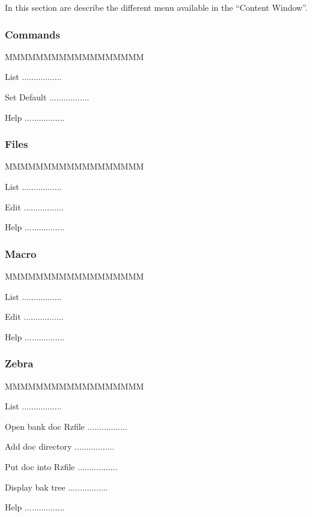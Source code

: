 In this section are describe the different menu available in the 
``Content Window''.

\subsubsection{Commands}

\begin{DLsf}{MMMMMMMMMMMMMMMMMM}
\item[List]         .................
\item[Set Default]  .................
\item[Help]  .................
\end{DLsf}

\newpage
\subsubsection{Files}

\begin{DLsf}{MMMMMMMMMMMMMMMMMM}
\item[List]         .................
\item[Edit]  .................
\item[Help]  .................
\end{DLsf}

\newpage
{}
\subsubsection{Macro}
\begin{DLsf}{MMMMMMMMMMMMMMMMMM}
\item[List]         .................
\item[Edit]  .................
\item[Help]  .................
\end{DLsf}

\newpage
\subsubsection{Zebra}

\begin{DLsf}{MMMMMMMMMMMMMMMMMM}
\item[List]         .................
\item[Open bank doc Rzfile]  .................
\item[Add doc directory]  .................
\item[Put doc into Rzfile]  .................
\item[Display bak tree]  .................
\item[Help]  .................
\end{DLsf}

